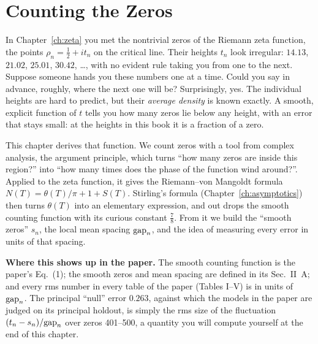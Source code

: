 \chapter{Counting the Zeros}\label{ch:counting-zeros}

\begin{chapterintro}
In Chapter~\ref{ch:zeta} you met the nontrivial zeros of the Riemann zeta function, the points $\rho_n=\tfrac12+it_n$ on the critical line. Their heights $t_n$ look irregular: $14.13$, $21.02$, $25.01$, $30.42$, \dots, with no evident rule taking you from one to the next. Suppose someone hands you these numbers one at a time. Could you say in advance, roughly, where the next one will be? Surprisingly, yes. The individual heights are hard to predict, but their \emph{average density} is known exactly. A smooth, explicit function of $t$ tells you how many zeros lie below any height, with an error that stays small: at the heights in this book it is a fraction of a zero.

This chapter derives that function. We count zeros with a tool from complex analysis, the argument principle, which turns ``how many zeros are inside this region?'' into ``how many times does the phase of the function wind around?''. Applied to the zeta function, it gives the Riemann--von Mangoldt formula $N(T)=\theta(T)/\pi+1+S(T)$. Stirling's formula (Chapter~\ref{ch:asymptotics}) then turns $\theta(T)$ into an elementary expression, and out drops the smooth counting function with its curious constant $\tfrac78$. From it we build the ``smooth zeros'' $s_n$, the local mean spacing $\mathrm{gap}_n$, and the idea of measuring every error in units of that spacing.

\textbf{Where this shows up in the paper.} The smooth counting function is the paper's Eq.~(1); the smooth zeros and mean spacing are defined in its Sec.~II~A; and every rms number in every table of the paper (Tables I--V) is in units of $\mathrm{gap}_n$. The principal ``null'' error $0.263$, against which the models in the paper are judged on its principal holdout, is simply the rms size of the fluctuation $(t_n-s_n)/\mathrm{gap}_n$ over zeros 401--500, a quantity you will compute yourself at the end of this chapter.
\end{chapterintro}

